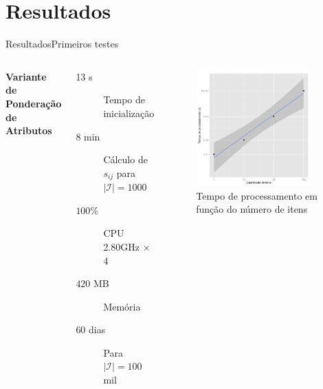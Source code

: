 \section[Resultados]{Resultados}

\begin{frame}{Resultados}{Primeiros testes}
\begin{columns}[c]
\textbf{Variante de Ponderação de Atributos}
\begin{description}
	\item[13 s] Tempo de inicialização
	\item[8 min] Cálculo de $s_{ij}$ para $\left|\mathcal{I}\right| = 1000$
	\item[$100 \%$] CPU \\ 2.80GHz $\times$ 4
	\item[$420$ MB] Memória 
	\item[]
	\item[60 dias] Para $\left|\mathcal{I}\right| = 100$  mil
\end{description}	
\begin{figure}[ht]
    \begin{center}
    \includegraphics[width=0.9\textwidth]{img/ixt}
    \end{center}
\caption{Tempo de processamento em função do número de itens}
\end{figure}
\end{columns}
\end{frame}



